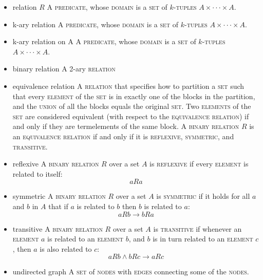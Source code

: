 \documentclass{article}
\newcommand{\term}[1]{\textsc{#1}}
\begin{document}
\bigskip \indent
\begin{itemize}
\item relation $R$
  \subitem A \term{predicate}, whose \term{domain} is a \term{set} of \term{$k$-tuples} $A \times \cdot \cdot \cdot \times A$.
\item k-ary relation
  \subitem A \term{predicate}, whose \term{domain} is a \term{set} of \term{$k$-tuples} $A \times \cdot \cdot \cdot \times A$.
\item k-ary relation on A
  \subitem A \term{predicate}, whose \term{domain} is a \term{set} of \term{$k$-tuples} $A \times \cdot \cdot \cdot \times A$.
\item binary relation
  \subitem A 2-ary \term{relation}
\item equivalence relation
  \subitem A \term{relation} that specifies how to partition a \term{set} such that every \term{element} of the \term{set} is in exactly one of the blocks in the partition, and the \term{union} of all the blocks equals the original \term{set}. Two \term{elements} of the \term{set} are considered equivalent (with respect to the \term{equivalence relation}) if and only if they are term{elements} of the same block. A \term{binary relation} $R$ is an \term{equivalence relation} if and only if it is \term{reflexive}, \term{symmetric}, and \term{transitive}.
\item reflexive
  \subitem A \term{binary relation} $R$ over a set $A$ is \term{reflexive} if every \term{element} is related to itself: $$aRa$$
\item symmetric
  \subitem A \term{binary relation} $R$ over a set $A$ is \term{symmetric} if it holds for all $a$ and $b$ in $A$ that if $a$ is related to $b$ then $b$ is related to $a$: $$aRb  \rightarrow bRa$$
\item transitive
  \subitem A \term{binary relation} $R$ over a set $A$ is \term{transitive} if whenever an \term{element} $a$ is related to an \term{element} $b$, and $b$ is in turn related to an \term{element} $c$, then $a$ is also related to $c$: $$aRb \wedge bRc \rightarrow aRc$$
\item undirected graph
  \subitem A \term{set} of \term{nodes} with \term{edges} connecting some of the \term{nodes}.
\end{itemize}
\end{document}
